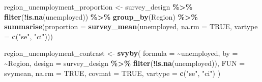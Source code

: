 \documentclass[
  spanish,
  12pt,
]{book}
\newenvironment{Shaded}{\begin{snugshade}}{\end{snugshade}}
\newcommand{\AttributeTok}[1]{\textcolor[rgb]{0.13,0.29,0.53}{#1}}
\newcommand{\ConstantTok}[1]{\textcolor[rgb]{0.56,0.35,0.01}{#1}}
\newcommand{\FunctionTok}[1]{\textcolor[rgb]{0.13,0.29,0.53}{\textbf{#1}}}
\newcommand{\NormalTok}[1]{#1}
\newcommand{\OtherTok}[1]{\textcolor[rgb]{0.56,0.35,0.01}{#1}}
\newcommand{\SpecialCharTok}[1]{\textcolor[rgb]{0.81,0.36,0.00}{\textbf{#1}}}
\newcommand{\StringTok}[1]{\textcolor[rgb]{0.31,0.60,0.02}{#1}}
\begin{document}
\begin{Shaded}
\begin{Highlighting}[]
\NormalTok{region\_unemployment\_proportion }\OtherTok{\textless{}{-}}\NormalTok{ survey\_design }\SpecialCharTok{\%\textgreater{}\%}
  \FunctionTok{filter}\NormalTok{(}\SpecialCharTok{!}\FunctionTok{is.na}\NormalTok{(unemployed)) }\SpecialCharTok{\%\textgreater{}\%}
  \FunctionTok{group\_by}\NormalTok{(Region) }\SpecialCharTok{\%\textgreater{}\%}
  \FunctionTok{summarise}\NormalTok{(}\AttributeTok{proportion =} \FunctionTok{survey\_mean}\NormalTok{(unemployed,}
                                     \AttributeTok{na.rm =} \ConstantTok{TRUE}\NormalTok{,}
                                     \AttributeTok{vartype =} \FunctionTok{c}\NormalTok{(}\StringTok{"se"}\NormalTok{, }\StringTok{"ci"}\NormalTok{)))}

\NormalTok{region\_unemployment\_contrast }\OtherTok{\textless{}{-}} \FunctionTok{svyby}\NormalTok{(}
  \AttributeTok{formula =} \SpecialCharTok{\textasciitilde{}}\NormalTok{unemployed,}
  \AttributeTok{by =} \SpecialCharTok{\textasciitilde{}}\NormalTok{Region,}
  \AttributeTok{design =}\NormalTok{ survey\_design }\SpecialCharTok{\%\textgreater{}\%}
    \FunctionTok{filter}\NormalTok{(}\SpecialCharTok{!}\FunctionTok{is.na}\NormalTok{(unemployed)),}
  \AttributeTok{FUN =}\NormalTok{ svymean,}
  \AttributeTok{na.rm =} \ConstantTok{TRUE}\NormalTok{,}
  \AttributeTok{covmat =} \ConstantTok{TRUE}\NormalTok{,}
  \AttributeTok{vartype =} \FunctionTok{c}\NormalTok{(}\StringTok{"se"}\NormalTok{, }\StringTok{"ci"}\NormalTok{)}
\NormalTok{)}
\end{Highlighting}
\end{Shaded}
\end{document}
